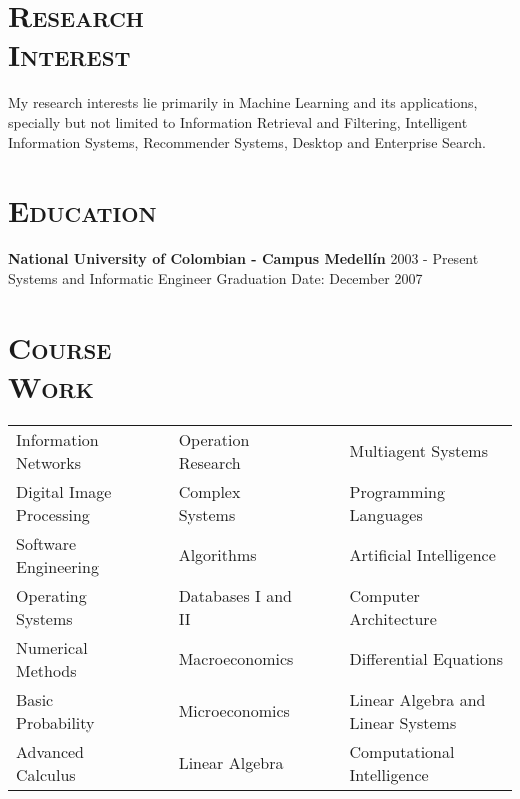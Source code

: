 \begin{resume}


\section{\textsc{Research\\ Interest}}
My research interests lie primarily in Machine Learning and its applications, specially but  not limited to Information Retrieval and Filtering, Intelligent Information Systems, Recommender Systems, Desktop and Enterprise Search.
\newline

\section{\textsc{Education}}
\textbf{National University of Colombian - Campus Medell\'{i}n} \hfill 2003 - Present \\
{Systems and Informatic Engineer} \hfill Graduation Date: December 2007\\

\section{\textsc{Course\\ Work}}
  \begin{tabular}{lllll}
Information Networks   & \ \ &  Operation Research   & \ \ &
Multiagent Systems  \\ 
Digital Image Processing     & \ \ & Complex Systems  & \ \ & Programming Languages \\
Software Engineering   & \ \ & Algorithms          & \ \ & Artificial Intelligence     \\
Operating Systems      & \ \ & Databases I and II          & \ \ & Computer Architecture \\
Numerical Methods      & \ \ & Macroeconomics       & \ \ & Differential Equations      \\
Basic Probability      & \ \ & Microeconomics      & \ \ & Linear Algebra and Linear Systems      \\
Advanced Calculus      & \ \ & Linear Algebra    & \ \ & Computational Intelligence   \\
\end{tabular}
\newline




\end{resume}
